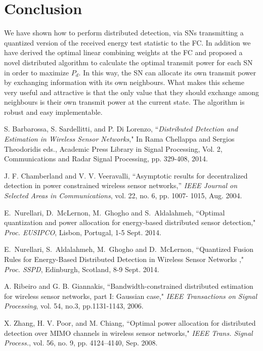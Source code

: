 \documentclass[conference]{IEEEtran}
\begin{document}
\section{Conclusion}
\label{CONCLUSION}
We have shown how to perform distributed detection, via SNs transmitting a quantized version of the received energy test statistic to the FC. In addition we have derived the optimal linear combining weights at the FC and proposed a novel distributed algorithm to calculate the optimal transmit power for each SN in order to maximize $P_d$. In this way, the SN can allocate its own transmit power by exchanging information with its own neighbours. What makes this scheme very useful and attractive is that the only value that they should exchange among neighbours is their own transmit power at the current state. The algorithm is robust and easy implementable.
\begin{thebibliography}{80}

 S. Barbarossa, S. Sardellitti, and P. Di Lorenzo, ``\emph{Distributed Detection and Estimation in Wireless Sensor Networks}," In Rama Chellappa and Sergios Theodoridis eds., Academic Press Library in Signal Processing, Vol. 2, Communications and Radar Signal Processing, pp. 329-408, 2014.

 J. F. Chamberland and V. V. Veeravalli, ``Asymptotic results for decentralized detection in power constrained wireless sensor networks,'' \emph{IEEE Journal on Selected Areas in Communications}, vol. 22, no. 6, pp. 1007- 1015, Aug. 2004.


 E.~Nurellari, D.~McLernon, M.~Ghogho and S.~Aldalahmeh, ``Optimal quantization and power allocation for energy-based distributed sensor detection," \emph{Proc. EUSIPCO}, Lisbon, Portugal, 1-5 Sept. 2014.

 E.~Nurellari, S.~Aldalahmeh, M.~Ghogho and D.~McLernon, ``Quantized Fusion Rules for Energy-Based Distributed Detection in Wireless Sensor Networks ," \emph{Proc. SSPD}, Edinburgh, Scotland, 8-9 Sept. 2014.

 A. Ribeiro and G. B. Giannakis, ``Bandwidth-constrained distributed estimation for wireless sensor networks, part I: Gaussian case," \emph{IEEE  Transactions on Signal Processing}, vol. 54, no.3, pp.1131-1143, 2006.


 X. Zhang, H. V. Poor, and M. Chiang, ``Optimal power allocation for distributed detection over MIMO channels in wireless sensor networks,"\emph{ IEEE Trans. Signal Process.}, vol. 56, no. 9, pp. 4124–4140, Sep. 2008.



\end{thebibliography}
\end{document}
